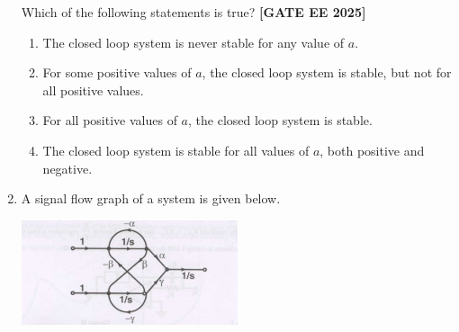 \documentclass[12pt,a4paper]{article}
\begin{document}
\begin{enumerate}[leftmargin=*, label=\textbf{Q.\arabic*:}]
Which of the following statements is true?
\newline
\noindent \textbf{[GATE EE 2025]}
\begin{enumerate}[label=(\Alph*)]
  \item The closed loop system is never stable for any value of $a$.
  \item For some positive values of $a$, the closed loop system is stable, but not for all positive values.
  \item For all positive values of $a$, the closed loop system is stable.
  \item The closed loop system is stable for all values of $a$, both positive and negative.
\end{enumerate}
\newpage
\item A signal flow graph of a system is given below.

\begin{center}
\includegraphics[width=0.5\textwidth]{figs/q40.png}
\end{center}



\end{enumerate}
\end{document}
